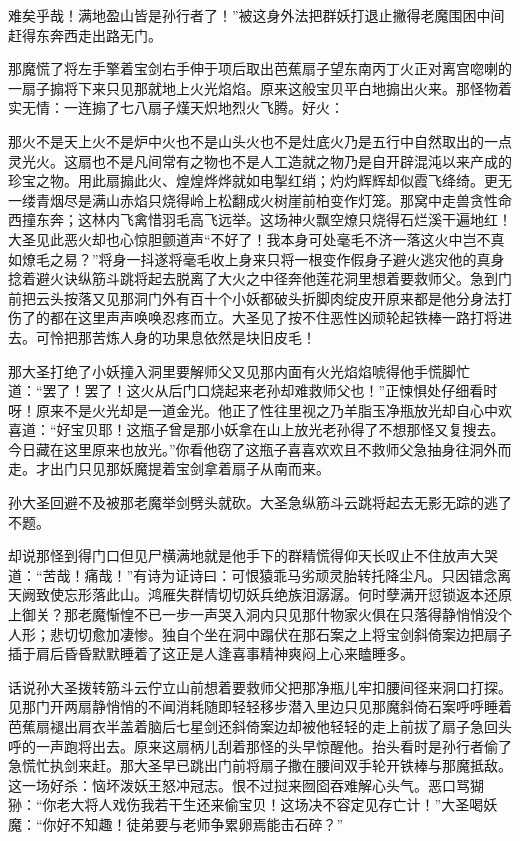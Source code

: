 \documentclass[12pt,UTF8]{ctexbook}
\begin{document}
难矣乎哉！满地盈山皆是孙行者了！”被这身外法把群妖打退止撇得老魔围困中间赶得东奔西走出路无门。

那魔慌了将左手擎着宝剑右手伸于项后取出芭蕉扇子望东南丙丁火正对离宫唿喇的一扇子搧将下来只见那就地上火光焰焰。原来这般宝贝平白地搧出火来。那怪物着实无情：一连搧了七八扇子熯天炽地烈火飞腾。好火：

那火不是天上火不是炉中火也不是山头火也不是灶底火乃是五行中自然取出的一点灵光火。这扇也不是凡间常有之物也不是人工造就之物乃是自开辟混沌以来产成的珍宝之物。用此扇搧此火、煌煌烨烨就如电掣红绡；灼灼辉辉却似霞飞绛绮。更无一缕青烟尽是满山赤焰只烧得岭上松翻成火树崖前柏变作灯笼。那窝中走兽贪性命西撞东奔；这林内飞禽惜羽毛高飞远举。这场神火飘空燎只烧得石烂溪干遍地红！大圣见此恶火却也心惊胆颤道声“不好了！我本身可处毫毛不济一落这火中岂不真如燎毛之易？”将身一抖遂将毫毛收上身来只将一根变作假身子避火逃灾他的真身捻着避火诀纵筋斗跳将起去脱离了大火之中径奔他莲花洞里想着要救师父。急到门前把云头按落又见那洞门外有百十个小妖都破头折脚肉绽皮开原来都是他分身法打伤了的都在这里声声唤唤忍疼而立。大圣见了按不住恶性凶顽轮起铁棒一路打将进去。可怜把那苦炼人身的功果息依然是块旧皮毛！

那大圣打绝了小妖撞入洞里要解师父又见那内面有火光焰焰唬得他手慌脚忙道：“罢了！罢了！这火从后门口烧起来老孙却难救师父也！”正悚惧处仔细看时呀！原来不是火光却是一道金光。他正了性往里视之乃羊脂玉净瓶放光却自心中欢喜道：“好宝贝耶！这瓶子曾是那小妖拿在山上放光老孙得了不想那怪又复搜去。今日藏在这里原来也放光。”你看他窃了这瓶子喜喜欢欢且不救师父急抽身往洞外而走。才出门只见那妖魔提着宝剑拿着扇子从南而来。

孙大圣回避不及被那老魔举剑劈头就砍。大圣急纵筋斗云跳将起去无影无踪的逃了不题。

却说那怪到得门口但见尸横满地就是他手下的群精慌得仰天长叹止不住放声大哭道：“苦哉！痛哉！”有诗为证诗曰：可恨猿乖马劣顽灵胎转托降尘凡。只因错念离天阙致使忘形落此山。鸿雁失群情切切妖兵绝族泪潺潺。何时孽满开愆锁返本还原上御关？那老魔惭惶不已一步一声哭入洞内只见那什物家火俱在只落得静悄悄没个人形；悲切切愈加凄惨。独自个坐在洞中蹋伏在那石案之上将宝剑斜倚案边把扇子插于肩后昏昏默默睡着了这正是人逢喜事精神爽闷上心来瞌睡多。

话说孙大圣拨转筋斗云佇立山前想着要救师父把那净瓶儿牢扣腰间径来洞口打探。见那门开两扇静悄悄的不闻消耗随即轻轻移步潜入里边只见那魔斜倚石案呼呼睡着芭蕉扇褪出肩衣半盖着脑后七星剑还斜倚案边却被他轻轻的走上前拔了扇子急回头呼的一声跑将出去。原来这扇柄儿刮着那怪的头早惊醒他。抬头看时是孙行者偷了急慌忙执剑来赶。那大圣早已跳出门前将扇子撒在腰间双手轮开铁棒与那魔抵敌。这一场好杀：恼坏泼妖王怒冲冠志。恨不过挝来囫囵吞难解心头气。恶口骂猢狲：“你老大将人戏伤我若干生还来偷宝贝！这场决不容定见存亡计！”大圣喝妖魔：“你好不知趣！徒弟要与老师争累卵焉能击石碎？”
\end{document}
